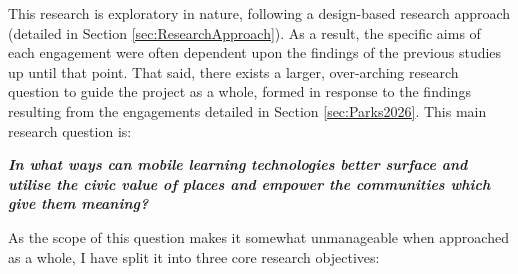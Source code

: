 This research is exploratory in nature, following a design-based research approach (detailed in Section \ref{sec:ResearchApproach}). As a result, the specific aims of each engagement were often dependent upon the findings of the previous studies up until that point. That said, there exists a larger, over-arching research question to guide the project as a whole, formed in response to the findings resulting from the engagements detailed in Section \ref{sec:Parks2026}. This main research question is:

\begin{displayquote}
\textit{\textbf{In what ways can mobile learning technologies better surface and utilise the civic value of places and empower the communities which give them meaning?}}
\end{displayquote}

As the scope of this question makes it somewhat unmanageable when approached as a whole, I have split it into three core research objectives:


